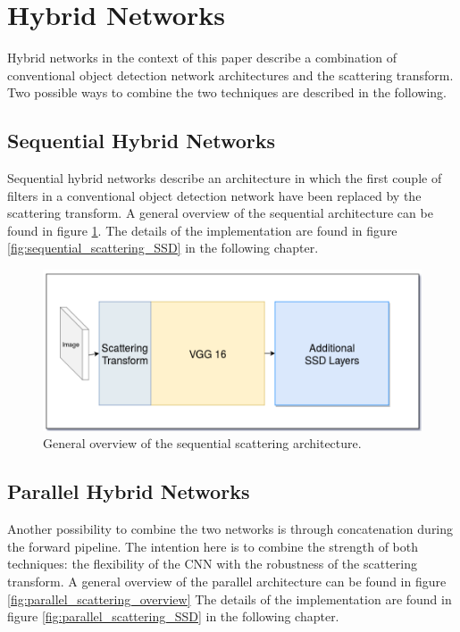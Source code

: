 \section{Hybrid Networks}

Hybrid networks in the context of this paper describe a combination of conventional object detection network architectures and the scattering transform. Two possible ways to combine the two techniques are described in the following.

\subsection{Sequential Hybrid Networks}

Sequential hybrid networks describe an architecture in which the first couple of filters in a conventional object detection network have been replaced by the scattering transform. A general overview of the sequential architecture can be found in figure \ref{fig:sequential_scattering_overview}. The details of the implementation are found in figure \ref{fig:sequential_scattering_SSD} in the following chapter. 

\begin{figure}[!htb]
	\centering
	\includegraphics[width=\textwidth]{images/sequential_scattering_overview.png}
	\caption{General overview of the sequential scattering architecture.}
	\label{fig:sequential_scattering_overview}	
\end{figure}


\subsection{Parallel Hybrid Networks}

Another possibility to combine the two networks is through concatenation during the forward pipeline. The intention here is to combine the strength of both techniques: the flexibility of the CNN with the robustness of the scattering transform. A general overview of the parallel architecture can be found in figure \ref{fig:parallel_scattering_overview} The details of the implementation are found in figure \ref{fig:parallel_scattering_SSD} in the following chapter. 

